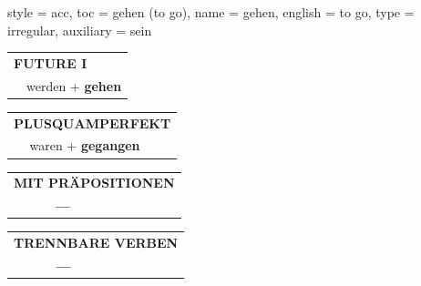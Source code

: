 \begin{verbentry}{
  style = {acc},
  toc = {gehen (to go)},
  name = {gehen},
  english = {to go},
  type = {irregular},
  auxiliary = {sein}
}
\begin{tabular}{rl}
    \multicolumn{2}{l}{\textbf{FUTURE I} }\\
   & werden + \textbf{gehen}\\
 
  \end{tabular}
\hfill
   \begin{tabular}{rl}
      \multicolumn{2}{l}{\textbf{PLUSQUAMPERFEKT}}\\
   & waren + \textbf{gegangen}\\
  \end{tabular}
  
  
\vspace{10pt}

\begin{tabular}{lll}
\multicolumn{3}{l}{\textbf{MIT PRÄPOSITIONEN}}\\
& \textbf{---} & \\
\end{tabular}
\hfill
\begin{tabular}{lll}
\multicolumn{3}{l}{\textbf{TRENNBARE VERBEN}}\\
& \textbf{---} & \\
\end{tabular}
\vspace{-5pt}
\end{verbentry}

